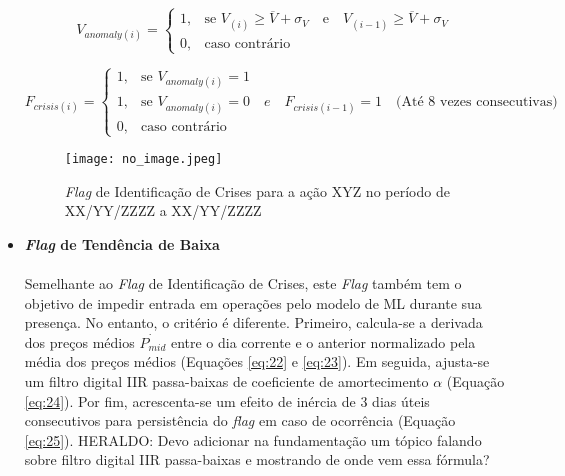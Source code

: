 \begin{itemize}
        \begin{equation} \label{eq:20}
            V_{anomaly(i)} = \begin{cases} 1, & \mbox{se } V_{(i)} \ge \overline{V} + \sigma_V \quad \textrm{e} \quad V_{(i-1)} \ge \overline{V} + \sigma_V \\ 0, & \mbox{caso contr\'ario} \end{cases}
        \end{equation}

        \begin{equation} \label{eq:21}
            F_{crisis(i)} = \begin{cases} 1, & \mbox{se } V_{anomaly(i)} = 1 \\ 1, & \mbox{se } V_{anomaly(i)} = 0 \quad e \quad F_{crisis(i-1)} = 1 \quad \textrm{(At\'e 8 vezes consecutivas)} \\ 0, & \mbox{caso contr\'ario} \end{cases}
        \end{equation}

        \begin{figure}[h]
            \texttt{[image: no\_image.jpeg]}
            \centering
            \caption{\textit{Flag} de Identificação de Crises para a ação XYZ no período de XX/YY/ZZZZ a XX/YY/ZZZZ}
            \label{fig:104}
        \end{figure}

    \item \textbf{\textit{Flag} de Tendência de Baixa} \\ \\
    Semelhante ao \textit{Flag} de Identificação de Crises, este \textit{Flag} também tem o objetivo de impedir entrada em operações pelo modelo de ML durante sua presença. No entanto, o critério é diferente. Primeiro, calcula-se a derivada dos preços médios \begin{math} \dot{P_{mid}} \end{math} entre o dia corrente e o anterior normalizado pela média dos preços médios (Equações \ref{eq:22} e \ref{eq:23}). Em seguida, ajusta-se um filtro digital IIR passa-baixas de coeficiente de amortecimento \begin{math} \alpha \end{math} (Equação \ref{eq:24}). Por fim, acrescenta-se um efeito de inércia de 3 dias úteis consecutivos para persistência do \textit{flag} em caso de ocorrência (Equação \ref{eq:25}). \color{red} HERALDO: Devo adicionar na fundamentação um tópico falando sobre filtro digital IIR passa-baixas e mostrando de onde vem essa fórmula? 


\end{itemize}
